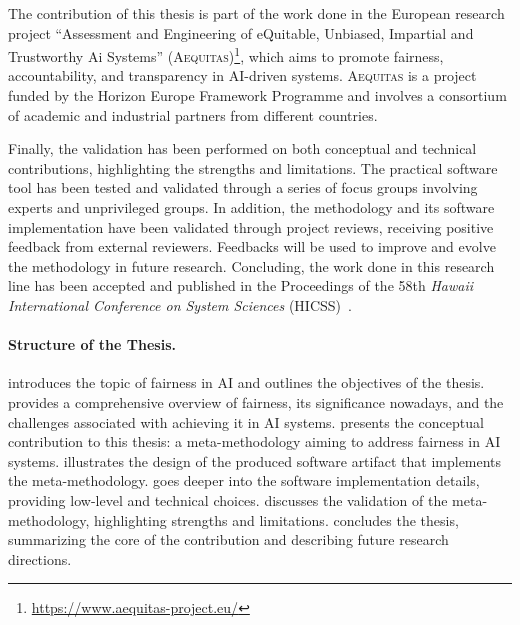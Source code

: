 \documentclass[12pt,a4paper,openright,twoside]{book}
\newcommand{\aequitas}{\textsc{Aequitas}}
\begin{document}
The contribution of this thesis is part of the work done in the European research project ``Assessment and Engineering of eQuitable, Unbiased, Impartial and Trustworthy Ai Systems'' (\aequitas{})\footnote{\href{https://www.aequitas-project.eu/}{https://www.aequitas-project.eu/}}, which aims to promote fairness, accountability, and transparency in \acs{AI}-driven systems.
%
\aequitas{} is a project funded by the Horizon Europe Framework Programme and involves a consortium of academic and industrial partners from different countries.

Finally, the validation has been performed on both conceptual and technical contributions, highlighting the strengths and limitations.
%
The practical software tool has been tested and validated through a series of focus groups involving experts and unprivileged groups.
%
In addition, the methodology and its software implementation have been validated through project reviews, receiving positive feedback from external reviewers.
%
Feedbacks will be used to improve and evolve the methodology in future research.
%
Concluding, the work done in this research line has been accepted and published in the Proceedings of the 58th \textit{Hawaii
International Conference on System Sciences} (HICSS)~\cite{hicssfairness2025}.




\paragraph{Structure of the Thesis.}

 introduces the topic of fairness in \ac{AI} and outlines the objectives of the thesis.
%
 provides a comprehensive overview of fairness, its significance nowadays, and the challenges associated with achieving it in \ac{AI} systems.
%
 presents the conceptual contribution to this thesis: a meta-methodology aiming to address fairness in \ac{AI} systems.
%
 illustrates the design of the produced software artifact that implements the meta-methodology.
%
 goes deeper into the software implementation details, providing low-level and technical choices.
%
 discusses the validation of the meta-methodology, highlighting strengths and limitations.
%
 concludes the thesis, summarizing the core of the contribution and describing future research directions.
\end{document}
